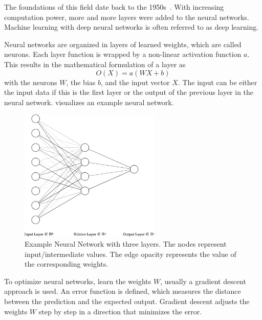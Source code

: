 The foundations of this field date back to the 1950s~\cite{rosenblatt1958perceptron}.
With increasing computation power, more and more layers were added to the neural networks.
Machine learning with deep neural networks is often referred to as deep learning.

Neural networks are organized in layers of learned weights, which are called neurons.
Each layer function is wrapped by a non-linear activation function $a$.
This results in the mathematical formulation of a layer as
\begin{equation}
    O(X) = a(WX+b)
\end{equation}
with the neurons $W$, the bias $b$, and the input vector $X$.
The input can be either the input data if this is the first layer or the output of the previous layer in the neural network.
 visualizes an example neural network.
\begin{figure}
    \centering
    \includegraphics[width=0.6\textwidth]{img/example_nn.inkscape-crop.pdf}
    \caption[Example Neural Network]{Example Neural Network with three layers. 
    The nodes represent input/intermediate values.
    The edge opacity represents the value of the corresponding weights.}
    \label{fig:bg:nn-example}
\end{figure}

To optimize neural networks, \ie learn the weights $W$, usually a gradient descent approach is used.
An error function is defined, which measures the distance between the prediction and the expected output.
Gradient descent adjusts the weights $W$ step by step in a direction that minimizes the error.
